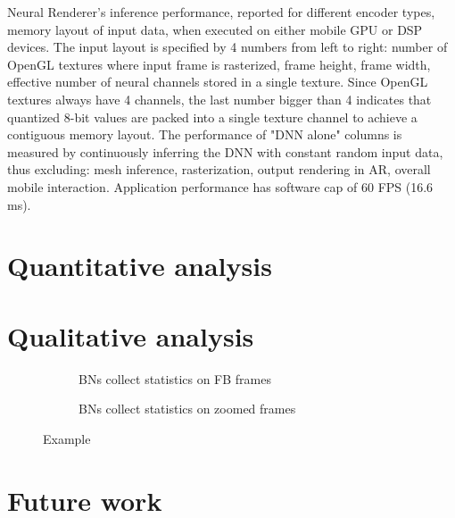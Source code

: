 \begin{table}[ht]
	\centering
	\caption{Neural Renderer's inference performance, reported for different encoder types, memory layout of input data, when executed on either mobile GPU or DSP devices. The input layout is specified by 4 numbers from left to right: number of OpenGL textures where input frame is rasterized, frame height, frame width, effective number of neural channels stored in a single texture. Since OpenGL textures always have 4 channels, the last number bigger than 4 indicates that quantized 8-bit values are packed into a single texture channel to achieve a contiguous memory layout. The performance of "DNN alone" columns is measured by continuously inferring the DNN with constant random input data, thus excluding: mesh inference, rasterization, output rendering in AR, overall mobile interaction. Application performance has software cap of 60 FPS (16.6 ms).}	\label{res:tab:other-solutions}		
\end{table} 

\section{Quantitative analysis}\label{res:metrics}
\section{Qualitative analysis}\label{res:quality}

\begin{figure}[h!]
	\fboxrule=1pt
	\centering
	\begin{subfigure}[b]{0.495\textwidth}
		\centering
		\caption{BNs collect statistics on FB frames}
		\label{res:fig:example}
	\end{subfigure}
	\begin{subfigure}[b]{0.495\textwidth}
		\centering
		\caption{BNs collect statistics on zoomed frames}
		\label{res:fig:example}
	\end{subfigure}
	\caption{Example}
	\label{res:fig:example}
\end{figure}

\section{Future work}\label{res:future}

